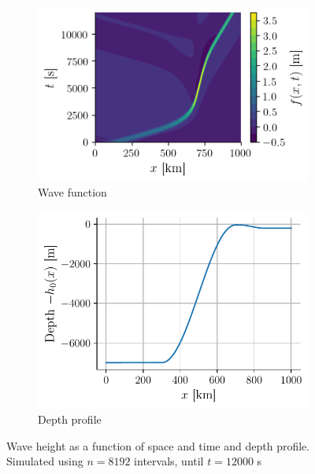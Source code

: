 \begin{figure}[h]
    \centering
    \begin{subfigure}{0.53\linewidth}
        \centering
        \includegraphics[width=\linewidth]{figures/corail_eq1_mouvement_vague.png}
        \caption{Wave function}
        \label{fig:corail_eq1_mouv}
    \end{subfigure}
    \begin{subfigure}{0.46\linewidth}
        \centering
        \includegraphics[width=\linewidth]{figures/corail_eq1_depth.pdf}
        \caption{Depth profile}
        \label{fig:corail_eq1_depth}
    \end{subfigure}
    \caption{Wave height as a function of space and time and depth profile. Simulated using \(n=8192\) intervals, until \(t=12000\) \si{\second}}
\end{figure}

